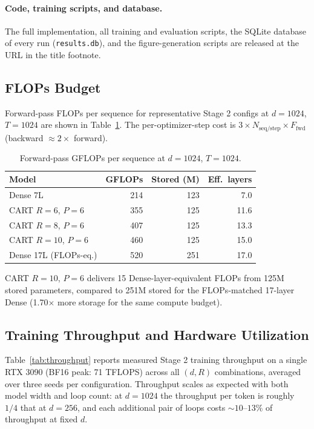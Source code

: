 \documentclass{article}
\begin{document}
\paragraph{Code, training scripts, and database.} The full implementation, all training and evaluation scripts, the SQLite database of every run (\texttt{results.db}), and the figure-generation scripts are released at the URL in the title footnote.

\subsection{FLOPs Budget}

Forward-pass FLOPs per sequence for representative Stage 2 configs at $d=1024$, $T=1024$ are shown in Table~\ref{tab:flops}. The per-optimizer-step cost is $3 \times N_\text{seq/step} \times F_\text{fwd}$ (backward $\approx 2\times$ forward).

\begin{table}[htbp]
\centering
\caption{Forward-pass GFLOPs per sequence at $d=1024$, $T=1024$.}
\label{tab:flops}
\footnotesize
\begin{tabular}{lrrr}
\toprule
Model & GFLOPs & Stored (M) & Eff.\ layers \\
\midrule
Dense 7L & 214 & 123 & 7.0 \\
CART $R{=}6$, $P{=}6$ & 355 & 125 & 11.6 \\
CART $R{=}8$, $P{=}6$ & 407 & 125 & 13.3 \\
CART $R{=}10$, $P{=}6$ & 460 & 125 & 15.0 \\
Dense 17L (FLOPs-eq.) & 520 & 251 & 17.0 \\
\bottomrule
\end{tabular}
\end{table}

CART $R=10$, $P=6$ delivers 15 Dense-layer-equivalent FLOPs from 125M stored parameters, compared to 251M stored for the FLOPs-matched 17-layer Dense (1.70$\times$ more storage for the same compute budget).

\subsection{Training Throughput and Hardware Utilization}
\label{sec:throughput}

Table~\ref{tab:throughput} reports measured Stage 2 training throughput on a single RTX 3090 (BF16 peak: 71 TFLOPS) across all $(d, R)$ combinations, averaged over three seeds per configuration. Throughput scales as expected with both model width and loop count: at $d{=}1024$ the throughput per token is roughly $1/4$ that at $d{=}256$, and each additional pair of loops costs $\sim 10$--$13\%$ of throughput at fixed $d$.
\end{document}
